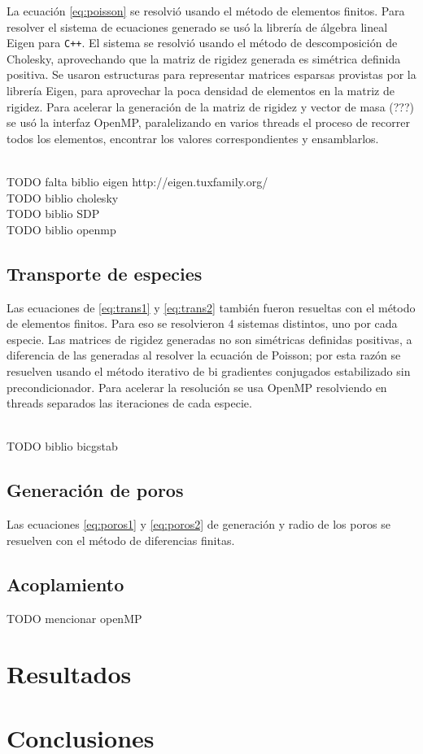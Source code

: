 \documentclass[a4paper,10pt]{article}
\begin{document}
La ecuación \ref{eq:poisson} se resolvió usando el método de elementos finitos. Para resolver el sistema de ecuaciones generado se usó la librería de álgebra lineal Eigen para \texttt{C++}. El sistema se resolvió usando el método de descomposición de Cholesky, aprovechando que la matriz de rigidez generada es simétrica definida positiva. Se usaron estructuras para representar matrices esparsas provistas por la librería Eigen, para aprovechar la poca densidad de elementos en la matriz de rigidez. Para acelerar la generación de la matriz de rigidez y vector de masa (???) se usó la interfaz OpenMP, paralelizando en varios threads el proceso de recorrer todos los elementos, encontrar los valores correspondientes y ensamblarlos.

\\TODO falta biblio eigen http://eigen.tuxfamily.org/
\\TODO biblio cholesky
\\TODO biblio SDP
\\TODO biblio openmp

\subsection{Transporte de especies}

Las ecuaciones de \ref{eq:trans1} y \ref{eq:trans2} también fueron resueltas con el método de elementos finitos. Para eso se resolvieron 4 sistemas distintos, uno por cada especie. Las matrices de rigidez generadas no son simétricas definidas positivas, a diferencia de las generadas al resolver la ecuación de Poisson; por esta razón se resuelven usando el método iterativo de bi gradientes conjugados estabilizado sin precondicionador. Para acelerar la resolución se usa OpenMP resolviendo en threads separados las iteraciones de cada especie.

\\TODO biblio bicgstab

\subsection{Generación de poros}

Las ecuaciones \ref{eq:poros1} y \ref{eq:poros2} de generación y radio de los poros se resuelven con el método de diferencias finitas. 

\subsection{Acoplamiento}

TODO mencionar openMP


\section{Resultados}

\section{Conclusiones}
\end{document}
